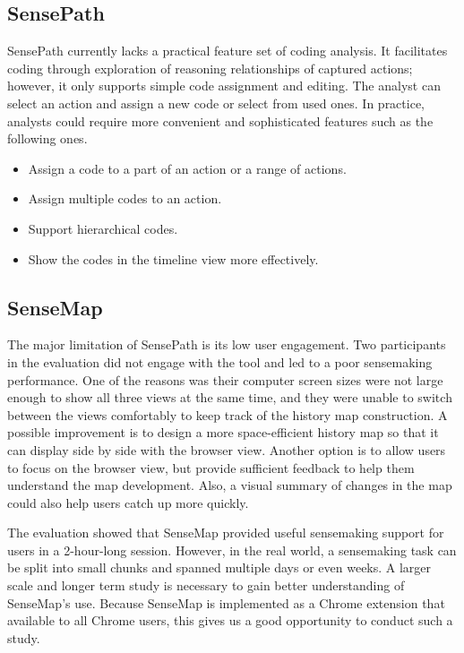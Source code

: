 \subsection{SensePath}
SensePath currently lacks a practical feature set of coding analysis. It facilitates coding through exploration of reasoning relationships of captured actions; however, it only supports simple code assignment and editing. The analyst can select an action and assign a new code or select from used ones. In practice, analysts could require more convenient and sophisticated features such as the following ones.
	\begin{itemize}
		\item Assign a code to a part of an action or a range of actions.
		\item Assign multiple codes to an action.
		\item Support hierarchical codes.
		\item Show the codes in the timeline view more effectively.
	\end{itemize}

\subsection{SenseMap}

The major limitation of SensePath is its low user engagement. Two participants in the evaluation did not engage with the tool and led to a poor sensemaking performance. One of the reasons was their computer screen sizes were not large enough to show all three views at the same time, and they were unable to switch between the views comfortably to keep track of the history map construction. A possible improvement is to design a more space-efficient history map so that it can display side by side with the browser view. Another option is to allow users to focus on the browser view, but provide sufficient feedback to help them understand the map development. Also, a visual summary of changes in the map could also help users catch up more quickly.

The evaluation showed that SenseMap provided useful sensemaking support for users in a 2-hour-long session. However, in the real world, a sensemaking task can be split into small chunks and spanned multiple days or even weeks. A larger scale and longer term study is necessary to gain better understanding of SenseMap's use. Because SenseMap is implemented as a Chrome extension that available to all Chrome users, this gives us a good opportunity to conduct such a study.

